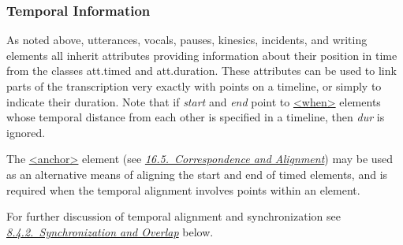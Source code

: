 \subsubsection[{Temporal Information}]{Temporal Information}\label{TSBATI}\par
As noted above, utterances, vocals, pauses, kinesics, incidents, and writing elements all inherit attributes providing information about their position in time from the classes \textsf{att.timed} and \textsf{att.duration}. These attributes can be used to link parts of the transcription very exactly with points on a timeline, or simply to indicate their duration. Note that if {\itshape start} and {\itshape end} point to \hyperref[TEI.when]{<when>} elements whose temporal distance from each other is specified in a timeline, then {\itshape dur} is ignored.\par
The \hyperref[TEI.anchor]{<anchor>} element (see \textit{\hyperref[SACS]{16.5.\ Correspondence and Alignment}}) may be used as an alternative means of aligning the start and end of timed elements, and is required when the temporal alignment involves points within an element.\par
For further discussion of temporal alignment and synchronization see \textit{\hyperref[TSSAPA]{8.4.2.\ Synchronization and Overlap}} below.
